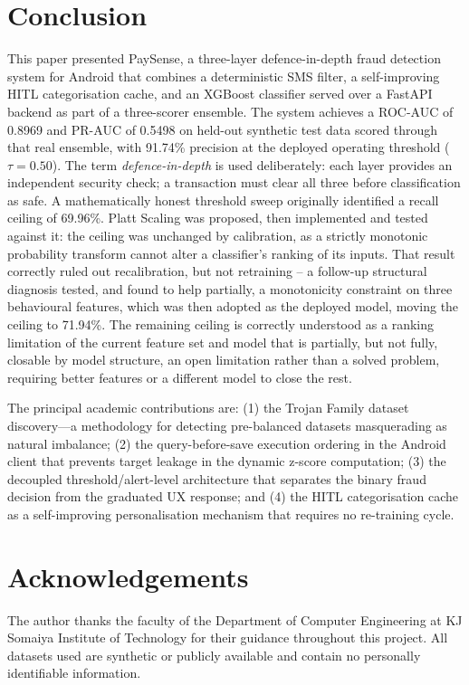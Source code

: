 \documentclass[conference]{IEEEtran}
\begin{document}
\section{Conclusion}

This paper presented PaySense, a three-layer defence-in-depth fraud detection
system for Android that combines a deterministic SMS filter, a
self-improving HITL categorisation cache, and an XGBoost classifier served
over a FastAPI backend as part of a three-scorer ensemble. The system
achieves a ROC-AUC of 0.8969 and PR-AUC of 0.5498 on held-out synthetic
test data scored through that real ensemble, with 91.74\% precision at
the deployed operating threshold ($\tau=0.50$).
The term \emph{defence-in-depth} is used deliberately: each layer provides
an independent security check; a transaction must clear all three before
classification as safe.
A mathematically honest threshold sweep originally identified a recall
ceiling of 69.96\%. Platt Scaling was proposed, then implemented and tested
against it: the ceiling was unchanged by calibration, as a strictly
monotonic probability transform cannot alter a classifier's ranking of its
inputs. That result correctly ruled out recalibration, but not retraining --
a follow-up structural diagnosis tested, and found to help partially, a
monotonicity constraint on three behavioural features, which was then
adopted as the deployed model, moving the ceiling to 71.94\%. The remaining
ceiling is correctly understood as a ranking limitation of the current
feature set and model that is partially, but not fully, closable by model
structure, an open limitation rather than a solved problem, requiring
better features or a different model to close the rest.

The principal academic contributions are: (1) the Trojan Family dataset
discovery---a methodology for detecting pre-balanced datasets masquerading
as natural imbalance; (2) the query-before-save execution ordering in the
Android client that prevents target leakage in the dynamic z-score
computation; (3) the decoupled threshold/alert-level architecture that
separates the binary fraud decision from the graduated UX response; and
(4) the HITL categorisation cache as a self-improving personalisation
mechanism that requires no re-training cycle.

\section*{Acknowledgements}
The author thanks the faculty of the Department of Computer Engineering
at KJ Somaiya Institute of Technology for their guidance throughout this
project. All datasets used are synthetic or publicly available and contain
no personally identifiable information.
\end{document}
